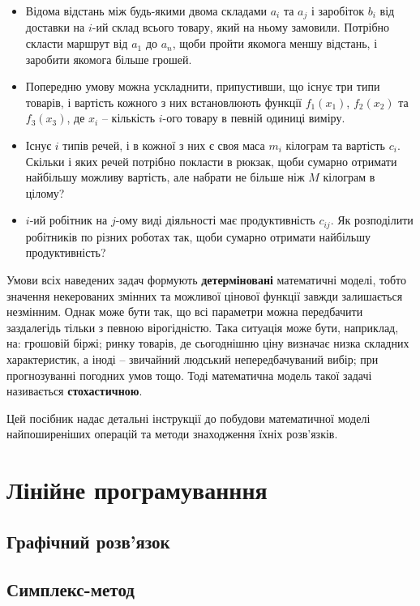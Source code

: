 \documentclass[a5paper,10pt]{book}
\begin{document}
\begin{itemize}
 \item Відома відстань між будь-якими двома складами $a_i$ та $a_j$ і заробіток $b_i$ від доставки на $i$-ий склад всього товару, який на ньому замовили. Потрібно скласти маршрут від $a_1$ до $a_n$, щоби пройти якомога меншу відстань, і заробити якомога більше грошей.
 \item Попередню умову можна ускладнити, припустивши, що існує три типи товарів, і вартість кожного з них встановлюють функції $f_1(x_1)$, $f_2(x_2)$ та $f_3(x_3)$, де $x_i$ -- кількість $i$-ого товару в певній одиниці виміру.
 \item Існує $i$ типів речей, і в кожної з них є своя маса $m_i$ кілограм та вартість $c_i$. Скільки і яких речей потрібно покласти в рюкзак, щоби сумарно отримати найбільшу можливу вартість, але набрати не більше ніж $M$ кілограм в цілому?
 \item $i$-ий робітник на $j$-ому виді діяльності має продуктивність $c_{ij}$. Як розподілити робітників по різних роботах так, щоби сумарно отримати найбільшу продуктивність?
\end{itemize}

Умови всіх наведених задач формують \textbf{детерміновані} математичні моделі, тобто значення некерованих змінних та можливої цінової функції завжди залишається незмінним. Однак може бути так, що всі параметри можна передбачити заздалегідь тільки з певною вірогідністю. Така ситуація може бути, наприклад, на: грошовій біржі; ринку товарів, де сьогоднішню ціну визначає низка складних характеристик, а іноді -- звичайний людський непередбачуваний вибір; при прогнозуванні погодних умов тощо. Тоді математична модель такої задачі називається \textbf{стохастичною}.

Цей посібник надає детальні інструкції до побудови математичної моделі найпоширеніших операцій та методи знаходження їхніх розв'язків.

\chapter{Лінійне програмуванння}

\section{Графічний розв'язок}

\section{Симплекс-метод}
\end{document}
